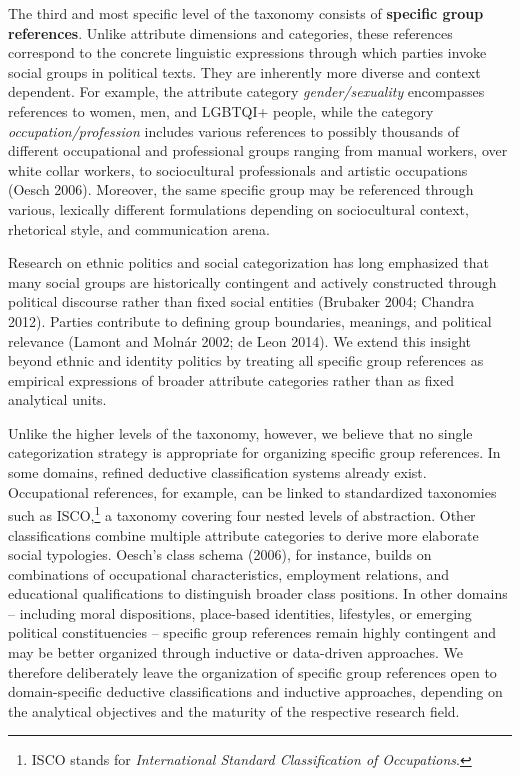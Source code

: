 \documentclass[12pt]{article}
\begin{document}
The third and most specific level of the taxonomy consists of \textbf{specific group references}.
Unlike attribute dimensions and categories, these references correspond to the concrete linguistic expressions through which parties invoke social groups in political texts.
They are inherently more diverse and context dependent.
For example, the attribute category \emph{gender/sexuality} encompasses references to women, men, and LGBTQI+ people, while the category \emph{occupation/profession} includes various references to possibly thousands of different occupational and professional groups ranging from manual workers, over white collar workers, to sociocultural professionals and artistic occupations (Oesch 2006).
Moreover, the same specific group may be referenced through various, lexically different formulations depending on sociocultural context, rhetorical style, and communication arena.

Research on ethnic politics and social categorization has long emphasized that many social groups are historically contingent and actively constructed through political discourse rather than fixed social entities (Brubaker 2004; Chandra 2012).
Parties contribute to defining group boundaries, meanings, and political relevance (Lamont and Molnár 2002; de Leon 2014).
We extend this insight beyond ethnic and identity politics by treating all specific group references as empirical expressions of broader attribute categories rather than as fixed analytical units.

Unlike the higher levels of the taxonomy, however, we believe that no single categorization strategy is appropriate for organizing specific group references.
In some domains, refined deductive classification systems already exist.
Occupational references, for example, can be linked to standardized taxonomies such as ISCO,\footnote{ISCO stands for \emph{International Standard Classification of Occupations}.} a taxonomy covering four nested levels of abstraction.
Other classifications combine multiple attribute categories to derive more elaborate social typologies.
Oesch's class schema (2006), for instance, builds on combinations of occupational characteristics, employment relations, and educational qualifications to distinguish broader class positions.
In other domains -- including moral dispositions, place-based identities, lifestyles, or emerging political constituencies -- specific group references remain highly contingent and may be better organized through inductive or data-driven approaches.
We therefore deliberately leave the organization of specific group references open to domain-specific deductive classifications and inductive approaches, depending on the analytical objectives and the maturity of the respective research field.
\end{document}
